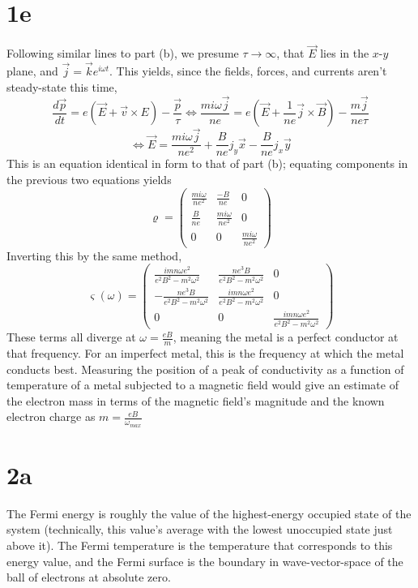 \documentclass{article}
\begin{document}
\section*{1e}
Following similar lines to part (b), we presume $\tau\to\infty$, that $\vec{E}$ lies in the $x$-$y$ plane, and $\vec{j}=\vec{k}e^{i\omega t}$.
This yields, since the fields, forces, and currents aren't steady-state this time,
\[\frac{d\vec{p}}{dt}=e\left( \vec{E}+\vec{v}\times E \right)-\frac{\vec{p}}{\tau}\Leftrightarrow \frac{mi\omega\vec{j}}{ne}=e\left( \vec{E}+\frac{1}{ne}\vec{j}\times \vec{B} \right)-\frac{m\vec{j}}{ne\tau}\]
\[\Leftrightarrow \vec{E}=\frac{mi\omega\vec{j}}{ne^2}+\frac{B}{ne}j_{y}\vec{x}- \frac{B}{ne}j_{x}\vec{y}\]
This is an equation identical in form to that of part (b); equating components in the previous two equations yields
\[\varrho=
  \begin{pmatrix}
    \frac{mi\omega}{ne^{2}} & \frac{-B}{ne} & 0 \\
    \frac{B}{ne} & \frac{mi\omega}{ne^{2}} & 0 \\
    0 & 0 & \frac{mi\omega}{ne^{2}}
  \end{pmatrix}
\]
Inverting this by the same method,
\[\varsigma(\omega)=
  \begin{pmatrix}
    \frac{imn\omega e^{2}}{e^{2}B^{2}-m^{2}\omega^{2}} & \frac{ne^{3}B}{e^{2}B^{2}-m^{2}\omega^{2}} & 0 \\
    -\frac{n e^{3}B}{e^{2}B^{2}-m^{2}\omega^{2}} & \frac{imn\omega e^{2}}{e^{2}B^{2}-m^{2}\omega^{2}} & 0 \\
    0 & 0 & \frac{imn\omega e^{2}}{e^{2}B^{2}-m^{2}\omega^{2}}
  \end{pmatrix}
\]
These terms all diverge at $\omega=\frac{eB}{m}$, meaning the metal is a perfect conductor at that frequency. For an imperfect metal, this is the frequency at which the metal conducts best. Measuring the position of a peak of conductivity as a function of temperature of a metal subjected to a magnetic field would give an estimate of the electron mass in terms of the magnetic field's magnitude and the known electron charge as $m=\frac{eB}{\omega_{max}}$

\section*{2a}
The Fermi energy is roughly the value of the highest-energy occupied state of the system (technically, this value's average with the lowest unoccupied state just above it). The Fermi temperature is the temperature that corresponds to this energy value, and the Fermi surface is the boundary in wave-vector-space of the ball of electrons at absolute zero.
\end{document}
